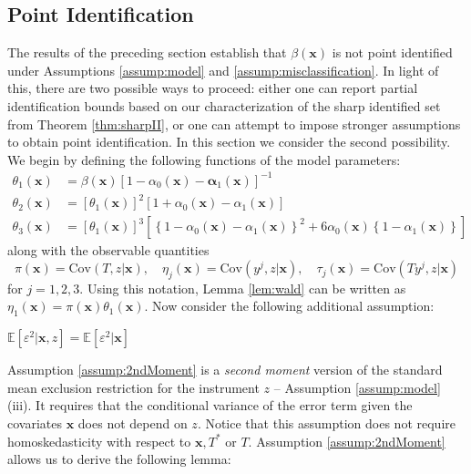 \subsection{Point Identification}
The results of the preceding section establish that $\beta(\mathbf{x})$ is not point identified under Assumptions \ref{assump:model} and \ref{assump:misclassification}.
In light of this, there are two possible ways to proceed: either one can report partial identification bounds based on our characterization of the sharp identified set from Theorem \ref{thm:sharpII}, or one can attempt to impose stronger assumptions to obtain point identification.
In this section we consider the second possibility.
We begin by defining the following functions of the model parameters: 
\begin{align}
  \label{eq:theta1_def}
  \theta_1(\mathbf{x}) &= \beta(\mathbf{x})\left[ 1 -  \alpha_0(\mathbf{x}) - \mathbf{\alpha}_1(\mathbf{x}) \right]^{-1}\\
  \label{eq:theta2_def}
  \theta_2(\mathbf{x}) &= \left[\theta_1(\mathbf{x})\right]^2 \left[ 1 + \alpha_0(\mathbf{x}) - \alpha_1(\mathbf{x})\right] \\
  \label{eq:theta3_def}
  \theta_3(\mathbf{x}) &= \left[\theta_1(\mathbf{x})\right]^3\left[ \left\{ 1 -\alpha_0(\mathbf{x}) - \alpha_1(\mathbf{x}) \right\}^2 + 6\alpha_0(\mathbf{x})\left\{ 1 - \alpha_1(\mathbf{x}) \right\} \right]
\end{align}
along with the observable quantities
\begin{equation}
  \pi(\mathbf{x}) = \mbox{Cov}(T,z|\mathbf{x}), \quad
  \eta_j(\mathbf{x}) = \mbox{Cov}(y^j,z|\mathbf{x}), \quad
  \tau_j(\mathbf{x}) = \mbox{Cov}(Ty^j,z|\mathbf{x})
  \label{eq:observables}
\end{equation}
for $j = 1, 2, 3$.
Using this notation, Lemma \ref{lem:wald} can be written as $\eta_1(\mathbf{x}) = \pi(\mathbf{x})\theta_1(\mathbf{x})$.
Now consider the following additional assumption:
\begin{assump} \mbox{}
  \label{assump:2ndMoment}
    $\mathbb{E}[\varepsilon^2|\mathbf{x},z] = \mathbb{E}[\varepsilon^2|\mathbf{x}]$ 
\end{assump}
Assumption \ref{assump:2ndMoment} is a \emph{second moment} version of the standard mean exclusion restriction for the instrument $z$ -- Assumption \ref{assump:model} (iii).
It requires that the conditional variance of the error term given the covariates $\mathbf{x}$ does not depend on $z$.
Notice that this assumption does not require homoskedasticity with respect to $\mathbf{x}, T^*$ or $T$.
Assumption \ref{assump:2ndMoment} allows us to derive the following lemma:

